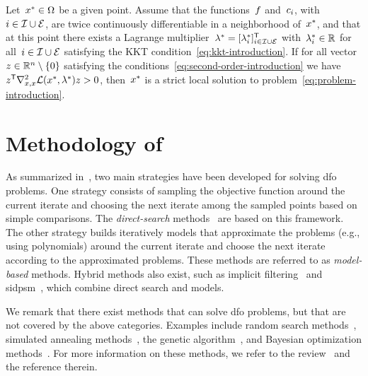 \begin{theorem}
    \label{thm:second-order-sufficient-conditions}
    Let~$\iter[\ast] \in \fset$ be a given point.
    Assume that the functions~$f$ and~$c_{i}$, with~$i \in \mathcal{I} \cup \mathcal{E}$, are twice continuously differentiable in a neighborhood of~$\iter[\ast]$, and that at this point there exists a Lagrange multiplier~$\lm[\ast] = [\lm[\ast]_i]_{i \in \iub \cup \ieq}^{\T}$ with~$\lm[\ast]_i \in \R$ for all~$i \in \mathcal{I} \cup \mathcal{E}$ satisfying the KKT condition~\cref{eq:kkt-introduction}.
    If for all vector~$z \in \mathbb{R}^n \setminus \{0\}$ satisfying the conditions~\cref{eq:second-order-introduction} we have~$z^{\T} \nabla_{x, x}^2 \lag(\iter[\ast], \lm[\ast]) z > 0$, then~$\iter[\ast]$ is a strict local solution to problem~\cref{eq:problem-introduction}.
\end{theorem}

\section{Methodology of }
\label{sec:methodology-dfo}

As summarized in~\cite{Conn_Scheinberg_Vicente_2009b}, two main strategies have been developed for solving \gls{dfo} problems.
One strategy consists of sampling the objective function around the current iterate and choosing the next iterate among the sampled points based on simple comparisons.
The \emph{direct-search} methods~\cite{Kolda_Lewis_Torczon_2003} are based on this framework.
The other strategy builds iteratively models that approximate the problems (e.g., using polynomials) around the current iterate and choose the next iterate according to the approximated problems.
These methods are referred to as \emph{model-based} methods.
Hybrid methods also exist, such as implicit filtering~\cite{Kelley_2011} and \gls{sidpsm}~\cite{Custodio_Rocha_Vicente_2009}, which combine direct search and models.

We remark that there exist methods that can solve \gls{dfo} problems, but that are not covered by the above categories.
Examples include random search methods~\cite{Zhigljavsky_1991}, simulated annealing methods~\cite{Kirkpatrick_Gelatt_Vecchi_1983}, the genetic algorithm~\cite{Jong_1975,Holland_1975}, and Bayesian optimization methods~\cite{Mockus_1975,Shahriari_Etal_2016}.
For more information on these methods, we refer to the review~\cite{Larson_Menickelly_Wild_2019} and the reference therein.

